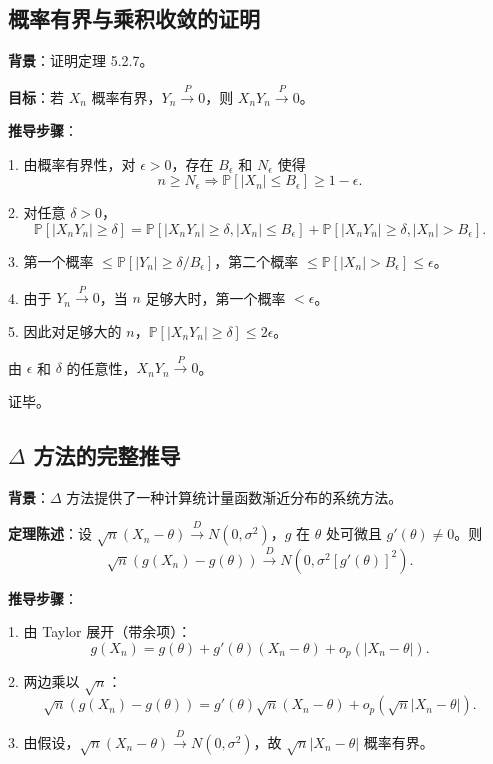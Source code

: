 \subsection{概率有界与乘积收敛的证明}\label{sec:product-convergence-proof}

\textbf{背景}：证明定理 5.2.7。

\textbf{目标}：若 ${X_n}$ 概率有界，$Y_n \xrightarrow{P} 0$，则 $X_n Y_n \xrightarrow{P} 0$。

\textbf{推导步骤}：

1. 由概率有界性，对 $\epsilon > 0$，存在 $B_\epsilon$ 和 $N_\epsilon$ 使得
\[
n \geq N_\epsilon \Rightarrow \mathbb{P}[|X_n| \leq B_\epsilon] \geq 1 - \epsilon.
\]

2. 对任意 $\delta > 0$，
\[
\mathbb{P}[|X_n Y_n| \geq \delta] = \mathbb{P}[|X_n Y_n| \geq \delta, |X_n| \leq B_\epsilon] + \mathbb{P}[|X_n Y_n| \geq \delta, |X_n| > B_\epsilon].
\]

3. 第一个概率 $\leq \mathbb{P}[|Y_n| \geq \delta/B_\epsilon]$，第二个概率 $\leq \mathbb{P}[|X_n| > B_\epsilon] \leq \epsilon$。

4. 由于 $Y_n \xrightarrow{P} 0$，当 $n$ 足够大时，第一个概率 $< \epsilon$。

5. 因此对足够大的 $n$，$\mathbb{P}[|X_n Y_n| \geq \delta] \leq 2\epsilon$。

由 $\epsilon$ 和 $\delta$ 的任意性，$X_n Y_n \xrightarrow{P} 0$。

证毕。

\subsection{$\Delta$ 方法的完整推导}\label{sec:delta-method-proof}

\textbf{背景}：$\Delta$ 方法提供了一种计算统计量函数渐近分布的系统方法。

\textbf{定理陈述}：设 $\sqrt{n}(X_n - \theta) \xrightarrow{D} N(0, \sigma^2)$，$g$ 在 $\theta$ 处可微且 $g'(\theta) \neq 0$。则
\[
\sqrt{n}(g(X_n) - g(\theta)) \xrightarrow{D} N(0, \sigma^2 [g'(\theta)]^2).
\]

\textbf{推导步骤}：

1. 由 Taylor 展开（带余项）：
\[
g(X_n) = g(\theta) + g'(\theta)(X_n - \theta) + o_p(|X_n - \theta|).
\]

2. 两边乘以 $\sqrt{n}$：
\[
\sqrt{n}(g(X_n) - g(\theta)) = g'(\theta)\sqrt{n}(X_n - \theta) + o_p(\sqrt{n}|X_n - \theta|).
\]

3. 由假设，$\sqrt{n}(X_n - \theta) \xrightarrow{D} N(0, \sigma^2)$，故 ${ \sqrt{n}|X_n - \theta| }$ 概率有界。

